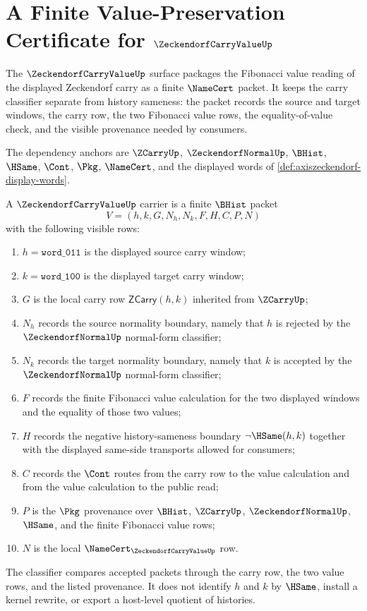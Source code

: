 \chapter{A Finite Value-Preservation Certificate for $\ZeckendorfCarryValueUp$}
\label{ch:concrete-instances-zeckendorf-carry-value-namecert}

The $\ZeckendorfCarryValueUp$ surface packages the Fibonacci value reading of the displayed Zeckendorf carry as a finite $\NameCert$ packet. It keeps the carry classifier separate from history sameness: the packet records the source and target windows, the carry row, the two Fibonacci value rows, the equality-of-value check, and the visible provenance needed by consumers.

The dependency anchors are $\ZCarryUp$, $\ZeckendorfNormalUp$, $\BHist$, $\HSame$, $\Cont$, $\Pkg$, $\NameCert$, and the displayed words of \autoref{def:axiszeckendorf-display-words}.

\begin{definition}
\label{def:zeckendorf-carry-value-carrier}
A $\ZeckendorfCarryValueUp$ carrier is a finite $\BHist$ packet
$$
V=(h,k,G,N_h,N_k,F,H,C,P,N)
$$
with the following visible rows:
\begin{enumerate}
\item $h=\mathtt{word\_011}$ is the displayed source carry window;
\item $k=\mathtt{word\_100}$ is the displayed target carry window;
\item $G$ is the local carry row $\mathsf{ZCarry}(h,k)$ inherited from $\ZCarryUp$;
\item $N_h$ records the source normality boundary, namely that $h$ is rejected by the $\ZeckendorfNormalUp$ normal-form classifier;
\item $N_k$ records the target normality boundary, namely that $k$ is accepted by the $\ZeckendorfNormalUp$ normal-form classifier;
\item $F$ records the finite Fibonacci value calculation for the two displayed windows and the equality of those two values;
\item $H$ records the negative history-sameness boundary $\neg\HSame(h,k)$ together with the displayed same-side transports allowed for consumers;
\item $C$ records the $\Cont$ routes from the carry row to the value calculation and from the value calculation to the public read;
\item $P$ is the $\Pkg$ provenance over $\BHist$, $\ZCarryUp$, $\ZeckendorfNormalUp$, $\HSame$, and the finite Fibonacci value rows;
\item $N$ is the local $\NameCert_{\ZeckendorfCarryValueUp}$ row.
\end{enumerate}
The classifier compares accepted packets through the carry row, the two value rows, and the listed provenance. It does not identify $h$ and $k$ by $\HSame$, install a kernel rewrite, or export a host-level quotient of histories.
\end{definition}

